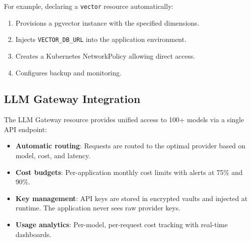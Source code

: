 For example, declaring a \texttt{vector} resource automatically:
\begin{enumerate}[leftmargin=1.4em]
    \item Provisions a pgvector instance with the specified dimensions.
    \item Injects \texttt{VECTOR\_DB\_URL} into the application environment.
    \item Creates a Kubernetes NetworkPolicy allowing direct access.
    \item Configures backup and monitoring.
\end{enumerate}

\subsection{LLM Gateway Integration}

The LLM Gateway resource provides unified access to 100+ models via a single API endpoint:

\begin{itemize}[leftmargin=1.1em]
    \item \textbf{Automatic routing}: Requests are routed to the optimal provider based on model, cost, and latency.
    \item \textbf{Cost budgets}: Per-application monthly cost limits with alerts at 75\% and 90\%.
    \item \textbf{Key management}: API keys are stored in encrypted vaults and injected at runtime. The application never sees raw provider keys.
    \item \textbf{Usage analytics}: Per-model, per-request cost tracking with real-time dashboards.
\end{itemize}


